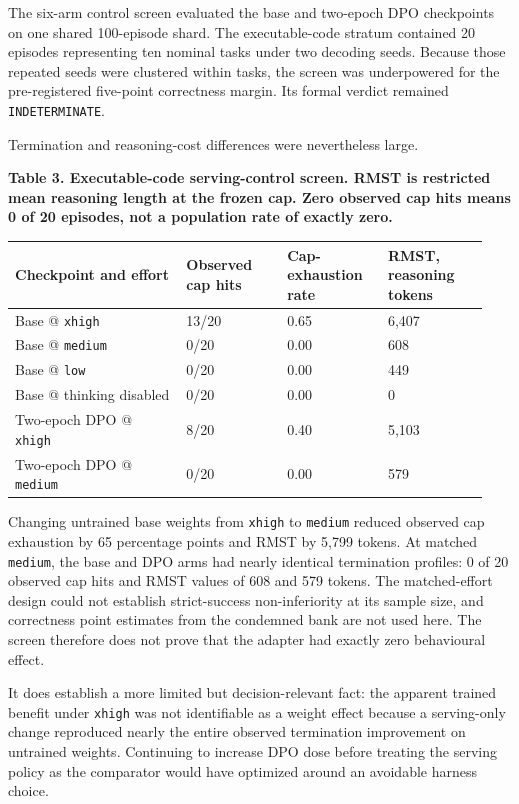 \documentclass[
  9pt,
  letterpaper,
]{article}
\begin{document}
The six-arm control screen evaluated the base and two-epoch DPO
checkpoints on one shared 100-episode shard. The executable-code stratum
contained 20 episodes representing ten nominal tasks under two decoding
seeds. Because those repeated seeds were clustered within tasks, the
screen was underpowered for the pre-registered five-point correctness
margin. Its formal verdict remained \texttt{INDETERMINATE}.

Termination and reasoning-cost differences were nevertheless large.

\textbf{Table 3. Executable-code serving-control screen. RMST is
restricted mean reasoning length at the frozen cap. Zero observed cap
hits means 0 of 20 episodes, not a population rate of exactly zero.}

\begin{longtable}[]{@{}p{0.34\linewidth}p{0.20\linewidth}p{0.20\linewidth}p{0.20\linewidth}@{}}
\toprule\noalign{}
Checkpoint and effort & Observed cap hits & Cap-exhaustion rate & RMST,
reasoning tokens \\
\midrule\noalign{}
\endhead
\bottomrule\noalign{}
\endlastfoot
Base @ \texttt{xhigh} & 13/20 & 0.65 & 6,407 \\
Base @ \texttt{medium} & 0/20 & 0.00 & 608 \\
Base @ \texttt{low} & 0/20 & 0.00 & 449 \\
Base @ thinking disabled & 0/20 & 0.00 & 0 \\
Two-epoch DPO @ \texttt{xhigh} & 8/20 & 0.40 & 5,103 \\
Two-epoch DPO @ \texttt{medium} & 0/20 & 0.00 & 579 \\
\end{longtable}

Changing untrained base weights from \texttt{xhigh} to \texttt{medium}
reduced observed cap exhaustion by 65 percentage points and RMST by
5,799 tokens. At matched \texttt{medium}, the base and DPO arms had
nearly identical termination profiles: 0 of 20 observed cap hits and
RMST values of 608 and 579 tokens. The matched-effort design could not
establish strict-success non-inferiority at its sample size, and
correctness point estimates from the condemned bank are not used here.
The screen therefore does not prove that the adapter had exactly zero
behavioural effect.

It does establish a more limited but decision-relevant fact: the
apparent trained benefit under \texttt{xhigh} was not identifiable as a
weight effect because a serving-only change reproduced nearly the entire
observed termination improvement on untrained weights. Continuing to
increase DPO dose before treating the serving policy as the comparator
would have optimized around an avoidable harness choice.
\end{document}
